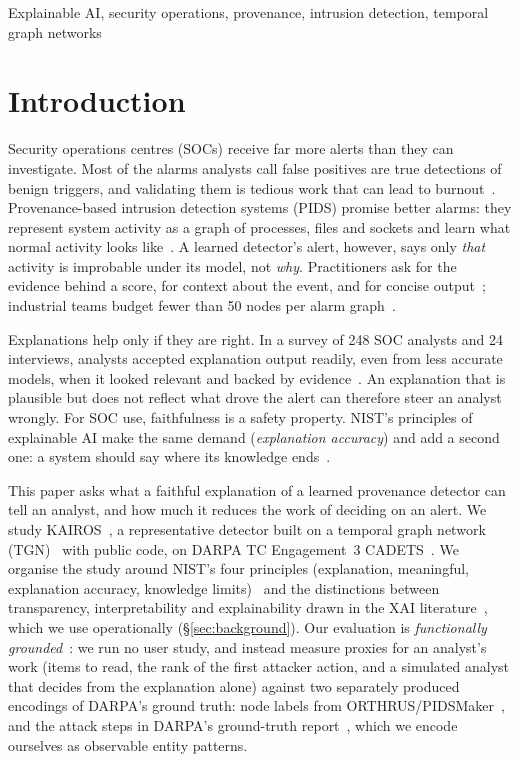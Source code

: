 \documentclass[conference]{IEEEtran}
\begin{document}
\begin{IEEEkeywords}
Explainable AI, security operations, provenance, intrusion detection, temporal graph networks
\end{IEEEkeywords}

\section{Introduction}
\label{sec:intro}
Security operations centres (SOCs) receive far more alerts than they can investigate. Most of the alarms
analysts call false positives are true detections of benign triggers, and validating them is tedious work
that can lead to burnout~\cite{alahmadi}. Provenance-based intrusion detection systems (PIDS) promise better alarms: they
represent system activity as a graph of processes, files and sockets and learn what normal activity looks
like~\cite{kairos,unicorn,orthrus,bilot}. A learned detector's alert, however, says only \emph{that}
activity is improbable under its model, not \emph{why}. Practitioners ask for the evidence behind a score,
for context about the event, and for concise output~\cite{mink,dong}; industrial teams budget fewer than 50
nodes per alarm graph~\cite{dong}.

Explanations help only if they are right. In a survey of 248 SOC analysts and 24 interviews,
analysts accepted explanation output readily, even from less accurate models, when it looked relevant
and backed by evidence~\cite{tmt}. An explanation that is plausible but does not reflect what drove the
alert can therefore steer an analyst wrongly. For SOC use, faithfulness is a safety property. NIST's
principles of explainable AI make the same demand (\emph{explanation accuracy}) and add a second one:
a system should say where its knowledge ends~\cite{nist}.

This paper asks what a faithful explanation of a learned provenance detector can tell an analyst, and how
much it reduces the work of deciding on an alert. We study KAIROS~\cite{kairos}, a representative
detector built on a temporal graph network (TGN)~\cite{tgn} with public code, on DARPA TC Engagement~3
CADETS~\cite{darpa}. We organise the study around NIST's four principles (explanation, meaningful,
explanation accuracy, knowledge limits)~\cite{nist} and the distinctions between transparency,
interpretability and explainability drawn in the XAI literature~\cite{lipton,arrieta}, which we use
operationally (\S\ref{sec:background}). Our evaluation is \emph{functionally
grounded}~\cite{doshivelez}: we run no user study, and instead measure proxies for an analyst's work
(items to read, the rank of the first attacker action, and a simulated analyst that decides from the
explanation alone) against two separately produced encodings of DARPA's ground truth: node labels from
ORTHRUS/PIDSMaker~\cite{orthrus,bilot}, and the attack steps in DARPA's ground-truth report~\cite{darpa},
which we encode ourselves as observable entity patterns.
\end{document}
